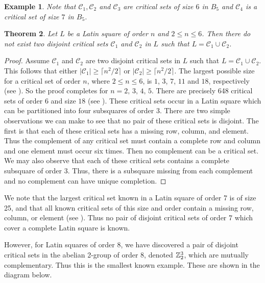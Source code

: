 \documentclass[11pt]{article}
\newtheorem{theorem}{Theorem}[section]
\newtheorem{example}[theorem]{Example}
\begin{document}
\begin{example}
{Note that ${\mathcal C}_1,{\mathcal C}_2$ and ${\mathcal C}_3$ are
critical sets of size $6$ in $B_5$ and ${\mathcal C}_4$ is a 
critical set of size $7$ in $B_5$. 
   
}
\end{example}

\begin{theorem}\label{no2disj}
Let $L$ be a Latin square of order $n$ and $2\leq n\leq 6$. Then there
do not exist two disjoint critical sets ${\mathcal C}_1$ and ${\mathcal C}_2$
in $L$ such that $L={\mathcal C}_1\cup {\mathcal C}_2$.
\end{theorem}

\begin{proof}
Assume ${\mathcal C}_1$ and ${\mathcal C}_2$ are two disjoint critical sets
in $L$ such that $L={\mathcal C}_1\cup {\mathcal C}_2$. This follows
that either $|{\mathcal C}_1|\geq \lceil n^2/2\rceil$
or $|{\mathcal C}_2|\geq \lceil n^2/2\rceil$. The largest possible size
for a critical set of order $n$, where $2\leq n\leq 6$, is $1$, $3$,
$7$, $11$ and $18$, respectively (see \cite {ABK}). So the proof
completes for $n=2,\,3,\,4,\,5$. There are precisely 648 critical sets
of order $6$ and size $18$ (see \cite{ABK}).  These critical sets
occur in a Latin square which can be partitioned into four
subsquares of order 3.
There are two simple observations we can make to see that no
pair of these critical sets is disjoint.  The first is that each
of these critical sets has a missing row, column, and element.  Thus
the complement of any critical set must contain a complete row and column
and one element must occur six times.  Then no complement can be a critical
set.  We may also observe that each of these critical sets contains
a complete subsquare of order 3.  Thus, there is a subsquare missing
from each complement and no complement can have unique completion.
\end{proof}

We note that the largest critical set known in a Latin square of order
7 is of size 25, and that all known critical sets of this size and order
contain a missing row, column, or element (see \cite{B}). 
Thus no pair of disjoint 
critical sets of order 7 which cover a complete Latin square is known.

However, for Latin squares of order 8, we have discovered a pair of
disjoint critical sets in the abelian 2-group of order 8, 
denoted ${\Bbb Z}_2^3$,
which are mutually complementary. Thus this is the smallest known
example. These are shown in the diagram below.
\end{document}

